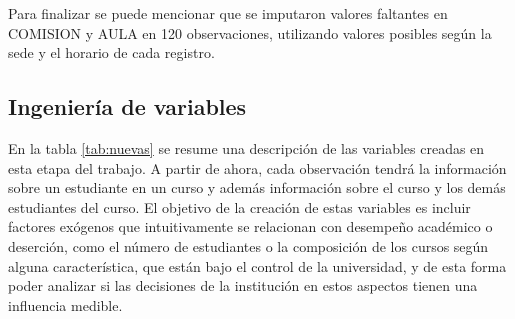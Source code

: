 \documentclass[a4paper,11pt,dvipsnames]{article}
\begin{document}
Para finalizar se puede mencionar que se imputaron valores faltantes en COMISION y AULA en 120 observaciones, utilizando valores posibles según la sede y el horario de cada registro.\par\medskip

\subsection{Ingeniería de variables}

En la tabla \ref{tab:nuevas} se resume una descripción de las variables creadas en esta etapa del trabajo. A partir de ahora, cada observación tendrá la información sobre un estudiante en un curso y además información sobre el curso y los demás estudiantes del curso. El objetivo de la creación de estas variables es incluir factores exógenos que intuitivamente se relacionan con desempeño académico o deserción, como el número de estudiantes o la composición de los cursos según alguna característica, que están bajo el control de la universidad, y de esta forma poder analizar si las decisiones de la institución en estos aspectos tienen una influencia medible.\par\medskip
\end{document}
